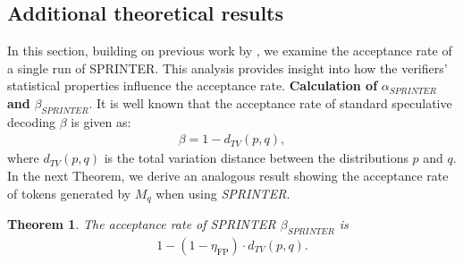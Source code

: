\documentclass{article}
\theoremstyle{plain}
\newtheorem{theorem}{Theorem}[section]
\theoremstyle{definition}
\theoremstyle{remark}
\begin{document}
\subsection{Additional theoretical results}
\label{sec:Acc_rate}
In this section, building on previous work by \cite{leviathan2023fast}, we examine the acceptance rate of a single run of SPRINTER. This analysis provides insight into how the verifiers' statistical properties influence the acceptance rate.
\textbf{Calculation of }$\alpha_{\textit{SPRINTER}}$ \textbf{and} $\beta_{\textit{SPRINTER}}$. It is well known \cite{leviathan2023fast} that the acceptance rate of standard speculative decoding $\beta$ is given as:
\begin{align}
    \beta = 1-d_{TV}(p,q),
\end{align}
where $d_{TV}(p,q)$ is the total variation distance  between the distributions $p$ and $q$. In the next Theorem, we derive an analogous result showing the acceptance rate of tokens generated by $M_q$ when using \textit{SPRINTER}.
\begin{theorem}\label{the: acceptance_rate}
    The acceptance rate of \textit{SPRINTER} $\beta_{\textit{SPRINTER}}$ is 
    \begin{align}
        1-(1-\eta_\text{FP})\cdot d_{TV}(p,q).
    \end{align}
\end{theorem}
\end{document}
